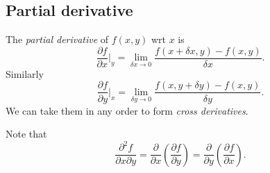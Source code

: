 \documentclass[10pt]{article}
\begin{document}
        \subsection{Partial derivative}
        \begin{definition}
            The \textit{partial derivative} of $ f(x,y) $ wrt $x$ is 
            \begin{equation}
                \frac{\partial f}{\partial x}\Big|_y = \lim_{\delta x \to 0} \frac{f(x+\delta x,y)-f(x,y)}{\delta x}.
            \end{equation}
            Similarly 
            \[
                \frac{\partial f}{\partial y}\Big|_x = \lim_{\delta y \to 0} \frac{f(x,y+\delta y)-f(x,y)}{\delta y}.
            \]
            We can take them in any order to form \textit{cross derivatives}.
        \end{definition}
        Note that 
        \begin{equation}
            \frac{\partial^2 f}{\partial x \partial y} = \frac{\partial }{\partial x}\left( \frac{\partial f}{\partial y}  \right)=\frac{\partial }{\partial y}\left( \frac{\partial f}{\partial x}  \right) .
        \end{equation}
\end{document}
